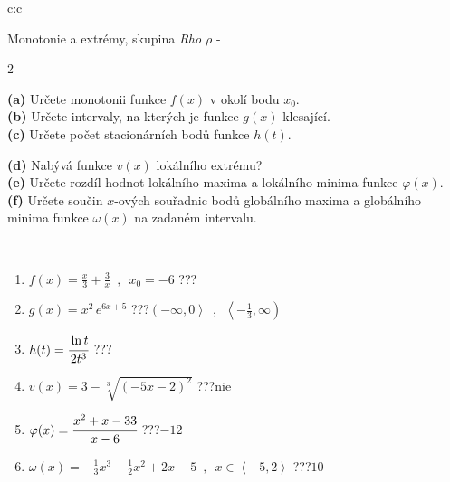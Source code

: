 \documentclass[10pt]{report}
\begin{document}
\newpage
\thispagestyle{empty}
\begin{tabular}{c:c}
\begin{minipage}[c][104.5mm][t]{0.5\linewidth}
\begin{center}
\vspace{7mm}
{\huge Monotonie a extrémy, skupina \textit{Rho $\rho$} -}\\[5mm]
\begin{minipage}{0.95\linewidth}
\begin{center}
{\small \begin{multicols}{2} \raggedright
\textbf{(a)} Určete monotonii funkce \(f(x)\) v okolí bodu \(x_0\). \\[1mm]
\textbf{(b)} Určete intervaly, na kterých je funkce \(g(x)\) klesající. \\[1mm]
\textbf{(c)} Určete počet stacionárních bodů funkce \(h(t)\). \par \columnbreak
\textbf{(d)} Nabývá funkce \(v(x)\) lokálního extrému? \\[1mm]
\textbf{(e)} Určete rozdíl hodnot lokálního maxima a lokálního minima funkce \(\varphi(x)\). \\[1mm]
\textbf{(f)} Určete součin \(x\)-ových souřadnic bodů globálního maxima a globálního minima funkce \(\omega(x)\) na zadaném intervalu. \\[1mm]
\end{multicols}
}
\end{center}
\end{minipage}
\\[4mm]
\begin{minipage}{0.79\linewidth}
\begin{center}
\begin{varwidth}{\linewidth}
\begin{enumerate}
\normalsize
\item $f(x)=\frac{x}{3}+\frac{3}{x} \enspace , \enspace x_0=-6$\quad \dotfill\; ???\;\dotfill \quad {}
\item $g(x)=x^2\, e^{6x+5}$\quad \dotfill\; ???\;\dotfill \quad $\left(-\infty , 0\right\rangle\enspace , \enspace \left\langle-\frac{1}{3} , \infty\right)$
\item $h(t)=\cfrac{\ln t}{2t^3}$\quad \dotfill\; ???\;\dotfill {}
\item $v(x)=3-\sqrt[3]{(-5x-2)^2}$\quad \dotfill\; ???\;\dotfill \quad $\text{nie}$
\item $\varphi(x)=\cfrac{x^2+x-33}{x-6}$\quad \dotfill\; ???\;\dotfill \quad $-12$
\item $\omega(x)=-\frac{1}{3}x^3-\frac{1}{2}x^2+2x-5 \enspace , \enspace x\in\left\langle-5 , 2\right\rangle$\quad \dotfill\; ???\;\dotfill \quad $10$

\end{enumerate}
\end{varwidth}
\end{center}
\end{minipage}
\end{center}
\end{minipage}
\end{tabular}
\end{document}
